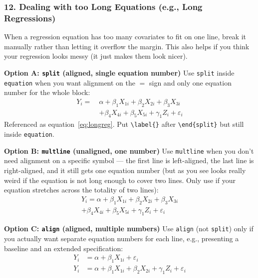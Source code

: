 \subsubsection*{12. Dealing with too Long Equations (e.g., Long Regressions)}
When a regression equation has too many covariates to fit on one line, break it manually rather than letting it overflow the margin. This also helps if you think your regression looks messy (it just makes them look nicer). 

\textbf{Option A: \texttt{split} (aligned, single equation number)}
Use \verb|split| inside \verb|equation| when you want alignment on the \(=\) sign and only one equation number for the whole block:
\begin{equation}
\begin{split}
Y_i = \ &\alpha + \beta_1 X_{1i} + \beta_2 X_{2i} + \beta_3 X_{3i} \\
        &+ \beta_4 X_{4i} + \beta_5 X_{5i} + \gamma_1 Z_i + \varepsilon_i
\end{split}
\label{eq:longreg}
\end{equation}
Referenced as equation~\ref{eq:longreg}. Put \verb|\label{}| after \verb|\end{split}| but still inside \verb|equation|.

\textbf{Option B: \texttt{multline} (unaligned, one number)}
Use \verb|multline| when you don't need alignment on a specific symbol --- the first line is left-aligned, the last line is right-aligned, and it still gets one equation number (but as you see looks really weird if the equation is not long enough to cover two lines. Only use if your equation stretches across the totality of two lines):
\begin{multline}
Y_i = \alpha + \beta_1 X_{1i} + \beta_2 X_{2i} + \beta_3 X_{3i} \\
+ \beta_4 X_{4i} + \beta_5 X_{5i} + \gamma_1 Z_i + \varepsilon_i
\end{multline}

\textbf{Option C: \texttt{align} (aligned, multiple numbers)}
Use \verb|align| (not \verb|split|) only if you actually want separate equation numbers for each line, e.g., presenting a baseline and an extended specification:
\begin{align}
Y_i &= \alpha + \beta_1 X_{1i} + \varepsilon_i \label{eq:baseline}\\
Y_i &= \alpha + \beta_1 X_{1i} + \beta_2 X_{2i} + \gamma_1 Z_i + \varepsilon_i \label{eq:extended}
\end{align}


